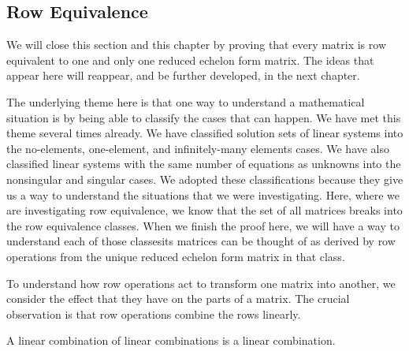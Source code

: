 \subsection{Row Equivalence}
We will close this section and this chapter by proving 
that every matrix is row equivalent to one
and only one reduced echelon form matrix.
The ideas that appear here will reappear, and be further developed, in the
next chapter.

The underlying theme here is that one way to understand a
mathematical situation is by being able to classify the cases that can happen.
We have met this theme several times already.
We have classified solution sets of linear systems into the no-elements, 
one-element, and infinitely-many elements cases.
We have also classified linear systems with the same number of equations 
as unknowns into the nonsingular and singular cases.
We adopted these classifications because they give us a way to understand
the situations that we were investigating.
Here, where we are investigating row equivalence, we know that the set of all
matrices breaks into the row equivalence classes.
When we finish the proof here, we will have a way to understand each of those
classes\Dash its matrices can be thought of as derived by row operations from the
unique reduced echelon form matrix in that class.

To understand how row operations act to transform one matrix into another,
we consider the effect that they have on the parts of a matrix.
The crucial observation is that row operations combine the rows linearly.



\begin{lemma} 
A linear combination of linear combinations is a linear combination.
\end{lemma}


